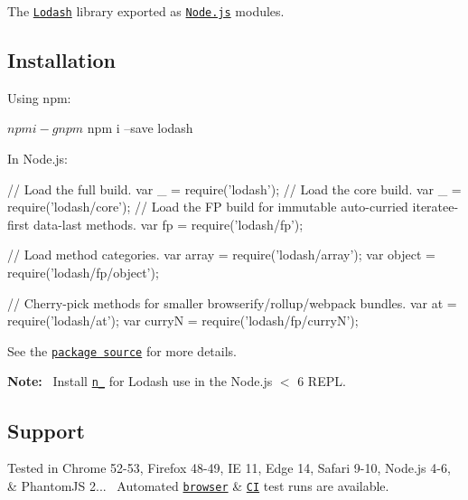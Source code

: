 The \href{https://lodash.com/}{\tt Lodash} library exported as \href{https://nodejs.org/}{\tt Node.\+js} modules.

\subsection*{Installation}

Using npm\+: 
\begin{DoxyCode}
$ npm i -g npm
$ npm i --save lodash
\end{DoxyCode}


In Node.\+js\+: 
\begin{DoxyCode}
// Load the full build.
var \_ = require('lodash');
// Load the core build.
var \_ = require('lodash/core');
// Load the FP build for immutable auto-curried iteratee-first data-last methods.
var fp = require('lodash/fp');

// Load method categories.
var array = require('lodash/array');
var object = require('lodash/fp/object');

// Cherry-pick methods for smaller browserify/rollup/webpack bundles.
var at = require('lodash/at');
var curryN = require('lodash/fp/curryN');
\end{DoxyCode}


See the \href{https://github.com/lodash/lodash/tree/4.16.4-npm}{\tt package source} for more details.

{\bfseries Note\+:}~\newline
 Install \href{https://www.npmjs.com/package/n_}{\tt n\+\_\+} for Lodash use in the Node.\+js $<$ 6 R\+E\+PL.

\subsection*{Support}

Tested in Chrome 52-\/53, Firefox 48-\/49, IE 11, Edge 14, Safari 9-\/10, Node.\+js 4-\/6, \& Phantom\+JS 2...~\newline
 Automated \href{https://saucelabs.com/u/lodash}{\tt browser} \& \href{https://travis-ci.org/lodash/lodash/}{\tt CI} test runs are available. 